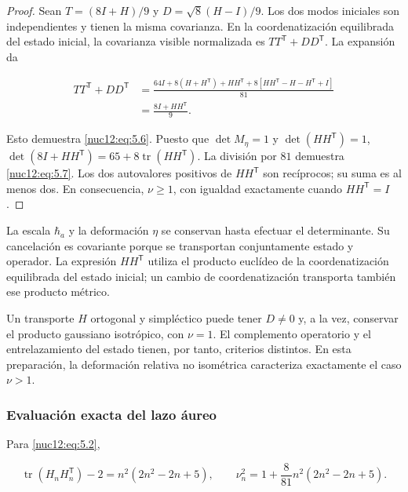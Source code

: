 \begin{proof}
Sean \(T=(8I+H)/9\) y \(D=\sqrt8(H-I)/9\). Los dos modos iniciales son independientes y tienen la misma covarianza. En la coordenatización equilibrada del estado inicial, la covarianza visible normalizada es \(TT^{\mathsf T}+DD^{\mathsf T}\). La expansión da



\[
\begin{aligned}
TT^{\mathsf T}+DD^{\mathsf T}
&=\frac{64I+8(H+H^{\mathsf T})+HH^{\mathsf T}
+8[HH^{\mathsf T}-H-H^{\mathsf T}+I]}{81}\\
&=\frac{8I+HH^{\mathsf T}}9.
\end{aligned}
\]



Esto demuestra \eqref{nuc12:eq:5.6}. Puesto que \(\det M_\eta=1\) y \(\det(HH^{\mathsf T})=1\),
\(\det(8I+HH^{\mathsf T})=65+8\operatorname{tr}(HH^{\mathsf T})\).
La división por \(81\) demuestra \eqref{nuc12:eq:5.7}. Los dos autovalores positivos de \(HH^{\mathsf T}\) son recíprocos; su suma es al menos dos. En consecuencia, \(\nu\geq1\), con igualdad exactamente cuando \(HH^{\mathsf T}=I\).
\end{proof}

La escala \(\hbar_a\) y la deformación \(\eta\) se conservan hasta efectuar el determinante. Su cancelación es covariante porque se transportan conjuntamente estado y operador. La expresión \(HH^{\mathsf T}\) utiliza el producto euclídeo de la coordenatización equilibrada del estado inicial; un cambio de coordenatización transporta también ese producto métrico.

Un transporte \(H\) ortogonal y simpléctico puede tener \(D\neq0\) y, a la vez, conservar el producto gaussiano isotrópico, con \(\nu=1\). El complemento operatorio y el entrelazamiento del estado tienen, por tanto, criterios distintos. En esta preparación, la deformación relativa no isométrica caracteriza exactamente el caso \(\nu>1\).

\subsubsection{Evaluación exacta del lazo áureo}

Para \eqref{nuc12:eq:5.2},



\begin{equation}
\operatorname{tr}(H_nH_n^{\mathsf T})-2
=n^2(2n^2-2n+5),\qquad
\nu_n^2=1+\frac8{81}n^2(2n^2-2n+5).
\label{nuc12:eq:5.8}
\end{equation}



